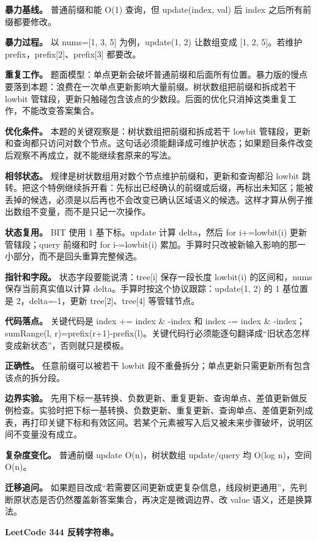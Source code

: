 \textbf{暴力基线。} 普通前缀和能 O(1) 查询，但 update(index, val) 后 index 之后所有前缀都要修改。

\textbf{暴力过程。} 以 nums=[1, 3, 5] 为例，update(1, 2) 让数组变成 [1, 2, 5]。若维护 prefix，prefix[2]、prefix[3] 都要改。

\textbf{重复工作。} 题面模型：单点更新会破坏普通前缀和后面所有位置。暴力版的慢点要落到本题：浪费在一次单点更新影响大量前缀。树状数组把前缀和拆成若干 lowbit 管辖段，更新只触碰包含该点的少数段。后面的优化只消掉这类重复工作，不能改变答案集合。

\textbf{优化条件。} 本题的关键观察是：树状数组把前缀和拆成若干 lowbit 管辖段，更新和查询都只访问对数个节点。这句话必须能翻译成可维护状态；如果题目条件改变后观察不再成立，就不能继续套原来的写法。

\textbf{相邻状态。} 规律是树状数组用对数个节点维护前缀和，更新和查询都沿 lowbit 跳转。把这个特例继续拆开看：先标出已经确认的前缀或后缀，再标出未知区；能被丢掉的候选，必须是以后再也不会改变已确认区域语义的候选。这样才算从例子推出数组不变量，而不是只记一次操作。

\textbf{状态复用。} BIT 使用 1 基下标。update 计算 delta，然后 for i+=lowbit(i) 更新管辖段；query 前缀和时 for i-=lowbit(i) 累加。手算时只改被新输入影响的那一小部分，而不是回头重算完整候选。

\textbf{指针和字段。} 状态字段要能说清：tree[i] 保存一段长度 lowbit(i) 的区间和，nums 保存当前真实值以计算 delta。手算时按这个协议跟踪：update(1, 2) 的 1 基位置是 2，delta=-1，更新 tree[2]、tree[4] 等管辖节点。

\textbf{代码落点。} 关键代码是 index += index \& -index 和 index -= index \& -index；sumRange(l, r)=prefix(r+1)-prefix(l)。关键代码行必须能逐句翻译成“旧状态怎样变成新状态”，否则就只是模板。

\textbf{正确性。} 任意前缀可以被若干 lowbit 段不重叠拆分；单点更新只需更新所有包含该点的拆分段。

\textbf{边界实验。} 先用下标一基转换、负数更新、重复更新、查询单点、差值更新做反例检查。实验时把下标一基转换、负数更新、重复更新、查询单点、差值更新列成表，再打印关键下标和有效区间。若某个元素被写入后又被未来步骤破坏，说明区间不变量没有成立。

\textbf{复杂度变化。} 普通前缀 update O(n)，树状数组 update/query 均 O(log n)，空间 O(n)。

\textbf{迁移追问。} 如果题目改成“若需要区间更新或更复杂信息，线段树更通用”，先判断原状态是否仍然覆盖新答案集合，再决定是微调边界、改 value 语义，还是换算法。

\noindent\textbf{LeetCode 344 反转字符串。}

